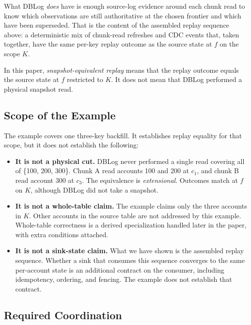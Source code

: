 \documentclass[letterpaper,10pt,twocolumn]{article}
\providecommand{\tightlist}{\setlength{\itemsep}{0pt}\setlength{\parskip}{0pt}}
\begin{document}
What DBLog \emph{does} have is enough source-log evidence around each
chunk read to know which observations are still authoritative at the
chosen frontier and which have been superseded. That is the content of
the assembled replay sequence above: a deterministic mix of chunk-read
refreshes and CDC events that, taken together, have the same per-key
replay outcome as the source state at $f$ on the scope $K$.

In this paper, \emph{snapshot-equivalent replay} means that the replay
outcome equals the source state at $f$ restricted to $K$. It does not
mean that DBLog performed a physical snapshot read.

\subsection{Scope of the Example}\label{what-this-example-does-not-show}

The example covers one three-key backfill. It establishes replay
equality for that scope, but it does not establish the following:

\begin{itemize}
\tightlist
\item
  \textbf{It is not a physical cut.} DBLog never performed a single read
  covering all of \{100, 200, 300\}. Chunk A read accounts 100 and 200 at
  $c_1$, and chunk B read account 300 at $c_3$. The equivalence is
  \emph{extensional}. Outcomes match at $f$ on $K$, although DBLog did
  not take a snapshot.
\item
  \textbf{It is not a whole-table claim.} The example claims only the
  three accounts in $K$. Other accounts in the source table are not
  addressed by this example. Whole-table correctness is a derived
  specialization handled later in the paper, with extra conditions
  attached.
\item
  \textbf{It is not a sink-state claim.} What we have shown is the
  assembled replay sequence. Whether a sink that consumes
  this sequence converges to the same per-account state is an additional
  contract on the consumer, including idempotency, ordering, and
  fencing. The example does not establish that contract.
\end{itemize}

\subsection{Required Coordination}\label{what-coordination-dblog-still-needs}
\end{document}

